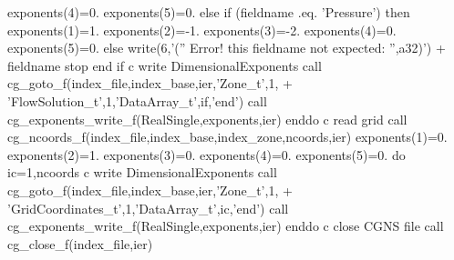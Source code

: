 \documentclass[12pt]{article}
\begin{document}
{\newline\indent\indent\indent          exponents(4)=0.
\newline\indent\indent\indent          exponents(5)=0.
\newline\indent\indent        else if (fieldname .eq. 'Pressure') then
\newline\indent\indent\indent          exponents(1)=1.
\newline\indent\indent\indent          exponents(2)=-1.
\newline\indent\indent\indent          exponents(3)=-2.
\newline\indent\indent\indent          exponents(4)=0.
\newline\indent\indent\indent          exponents(5)=0.
\newline\indent\indent        else
\newline\indent\indent\indent          write(6,'('' Error! this fieldname not expected: '',a32)')
\newline + \indent\indent\indent     fieldname
\newline\indent\indent\indent          stop
\newline\indent\indent        end if
\newline c   write DimensionalExponents
\newline\indent\indent        call cg\_goto\_f(index\_file,index\_base,ier,'Zone\_t',1,
\newline + \indent\indent   'FlowSolution\_t',1,'DataArray\_t',if,'end')
\newline\indent\indent        call cg\_exponents\_write\_f(RealSingle,exponents,ier)
\newline\indent      enddo
\newline c   read grid
\newline\indent      call cg\_ncoords\_f(index\_file,index\_base,index\_zone,ncoords,ier)
\newline\indent      exponents(1)=0.
\newline\indent      exponents(2)=1.
\newline\indent      exponents(3)=0.
\newline\indent      exponents(4)=0.
\newline\indent      exponents(5)=0.
\newline\indent      do ic=1,ncoords
\newline c   write DimensionalExponents
\newline\indent\indent        call cg\_goto\_f(index\_file,index\_base,ier,'Zone\_t',1,
\newline + \indent\indent    'GridCoordinates\_t',1,'DataArray\_t',ic,'end')
\newline\indent\indent        call cg\_exponents\_write\_f(RealSingle,exponents,ier)
\newline\indent      enddo
\newline c   close CGNS file
\newline\indent      call cg\_close\_f(index\_file,ier)
}
\end{document}
